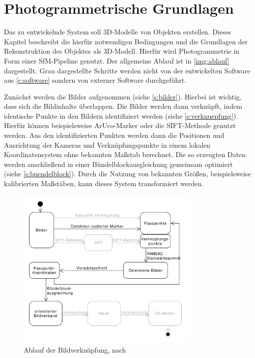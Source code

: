 \documentclass[./00PhotoBox.tex]{subfiles}
\begin{document}
\chapter{Photogrammetrische Grundlagen}
\label{c:photogrammetrie}
Das zu entwickelnde System soll 3D-Modelle von Objekten erstellen. Dieses Kapitel beschreibt die hierfür notwendigen Bedingungen und die Grundlagen der Rekonstruktion des Objektes als 3D-Modell. Hierfür wird Photogrammetrie in Form einer \gls{SfM}-Pipeline genutzt. Der allgemeine Ablauf ist in \autoref{img:ablauf} dargestellt. Grau dargestellte Schritte werden nicht von der entwickelten Software aus \autoref{c:software} sondern von externer Software durchgeführt.

Zunächst werden die Bilder aufgenommen (siehe \autoref{s:bilder}). Hierbei ist wichtig, dass sich die Bildinhalte überlappen. Die Bilder werden dann verknüpft, indem identische Punkte in den Bildern identifiziert werden  (siehe \autoref{s:verknuepfung}). Hierfür können beispielsweise ArUco-Marker oder die SIFT-Methode genutzt werden.
Aus den identifizierten Punkten werden dann die Positionen und Ausrichtung der Kameras und Verknüpfungspunkte in einem lokalen Koordinatensystem ohne bekannten Maßstab berechnet. Die so erzeugten Daten werden anschließend in einer Bündelblockausgleichung gemeinsam optimiert (siehe \autoref{s:buendelblock}). Durch die Nutzung von bekannten Größen, beispielsweise kalibrierten Maßstäben, kann dieses System transformiert werden.

\begin{figure}
    \centering
    \includegraphics[width=0.8\textwidth]{./img/uml/uml_ablauf.pdf}
    \caption{Ablauf der Bildverknüpfung, nach \citealt[S. 492]{luhmann}} %
    \label{img:ablauf} %
\end{figure}
\end{document}
